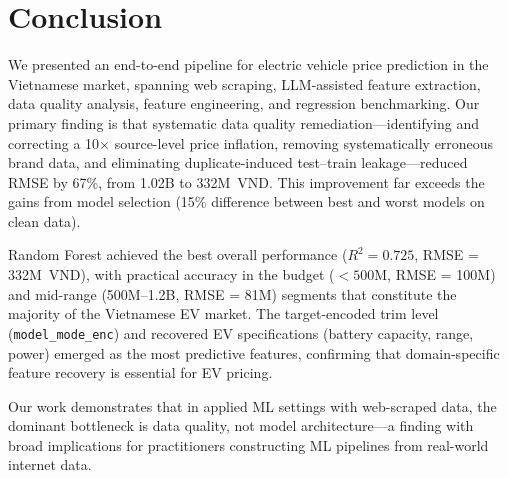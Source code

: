 \documentclass[lettersize,journal]{IEEEtran}
\begin{document}
\section{Conclusion}

We presented an end-to-end pipeline for electric vehicle price prediction in
the Vietnamese market, spanning web scraping, LLM-assisted feature
extraction, data quality analysis, feature engineering, and regression
benchmarking. Our primary finding is that systematic data quality
remediation---identifying and correcting a 10$\times$ source-level price
inflation, removing systematically erroneous brand data, and eliminating
duplicate-induced test--train leakage---reduced RMSE by 67\%, from 1.02B to
332M~VND. This improvement far exceeds the gains from model selection
(15\% difference between best and worst models on clean data).

Random Forest achieved the best overall performance ($R^2 = 0.725$,
RMSE = 332M~VND), with practical accuracy in the budget ($< 500$M, RMSE =
100M) and mid-range (500M--1.2B, RMSE = 81M) segments that constitute the
majority of the Vietnamese EV market. The target-encoded trim level
(\texttt{model\_mode\_enc}) and recovered EV specifications (battery
capacity, range, power) emerged as the most predictive features, confirming
that domain-specific feature recovery is essential for EV pricing.

Our work demonstrates that in applied ML settings with web-scraped data,
the dominant bottleneck is data quality, not model architecture---a finding
with broad implications for practitioners constructing ML pipelines from
real-world internet data.

\end{document}
